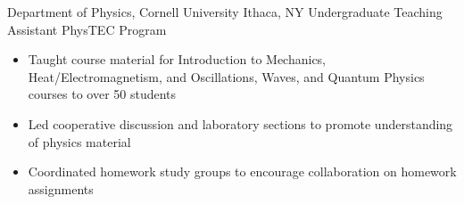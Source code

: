 
        {Department of Physics, Cornell University}
        {Ithaca, NY}
        {Undergraduate Teaching Assistant}
        {PhysTEC Program}{
    \begin{itemize}
        \item Taught course material for Introduction to Mechanics, Heat/Electromagnetism, and Oscillations, Waves, and Quantum Physics courses to over 50 students
        \item Led cooperative discussion and laboratory sections to promote understanding of physics material
        \item Coordinated homework study groups to encourage collaboration on homework assignments
    \end{itemize}
}
